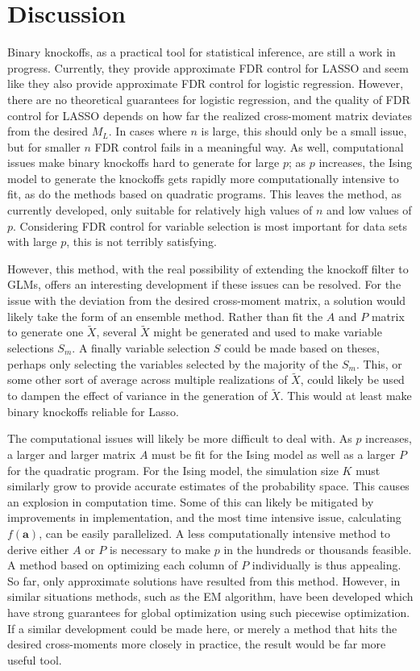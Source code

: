 \documentclass[11pt]{article}
\theoremstyle{definition}
\begin{document}
\section{Discussion}
    Binary knockoffs, as a practical tool for statistical inference, are still a work in progress. Currently, they provide approximate FDR control for LASSO and seem like they also provide approximate FDR control for logistic regression. However, there are no theoretical guarantees for logistic regression, and the quality of FDR control for LASSO depends on how far the realized cross-moment matrix deviates from the desired $M_L$. In cases where $n$ is large, this should only be a small issue, but for smaller $n$ FDR control fails in a meaningful way. As well, computational issues make binary knockoffs hard to generate for large $p$; as $p$ increases, the Ising model to generate the knockoffs gets rapidly more computationally intensive to fit, as do the methods based on quadratic programs. This leaves the method, as currently developed, only suitable for relatively high values of $n$ and low values of $p$. Considering FDR control for variable selection is most important for data sets with large $p$, this is not terribly satisfying. \par
    However, this method, with the real possibility of extending the knockoff filter to GLMs, offers an interesting development if these issues can be resolved. For the issue with the deviation from the desired cross-moment matrix, a solution would likely take the form of an ensemble method. Rather than fit the $A$ and $P$ matrix to generate one $\tilde X$, several $\tilde X$ might be generated and used to make variable selections $S_m$. A finally variable selection $S$ could be made based on theses, perhaps only selecting the variables selected by the majority of the $S_m$. This, or some other sort of average across multiple realizations of $\tilde X$, could likely be used to dampen the effect of variance in the generation of $\tilde X$. This would at least make binary knockoffs reliable for Lasso. \par
    The computational issues will likely be more difficult to deal with. As $p$ increases, a larger and larger matrix $A$ must be fit for the Ising model as well as a larger $P$ for the quadratic program. For the Ising model, the simulation size $K$ must similarly grow to provide accurate estimates of the probability space. This causes an explosion in computation time. Some of this can likely be mitigated by improvements in implementation, and the most time intensive issue, calculating $f(\mathbf a)$, can be easily parallelized. A less computationally intensive method to derive either $A$ or $P$ is necessary to make $p$ in the hundreds or thousands feasible. A method based on optimizing each column of $P$ individually is thus appealing. So far, only approximate solutions have resulted from this method. However, in similar situations methods, such as the EM algorithm, have been developed which have strong guarantees for global optimization using such piecewise optimization. If a similar development could be made here, or merely a method that hits the desired cross-moments more closely in practice, the result would be far more useful tool. \par
\end{document}
